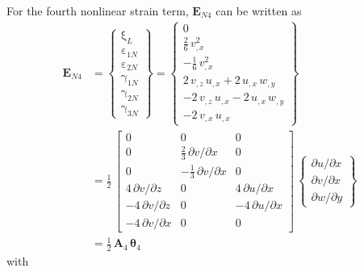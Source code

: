 For the fourth nonlinear strain term, $\mathbf{E}_{N4}$ can be written as
\begin{equation}
	\begin{aligned}
		\mathbf{E}_{N4} & =  \begin{Bmatrix}
			\mathrm \xi_{L} \\
			\mathrm \varepsilon_{1N} \\                    
			\mathrm \varepsilon_{2N} \\           
			\mathrm \gamma_{1N} \\                
			\mathrm \gamma_{2N} \\                
			\mathrm \gamma_{3N} \end{Bmatrix} =   
		\begin{Bmatrix}                       
			0\\
			\tfrac{2}{6} \, v_{,x}^2   \\
			- \tfrac{1}{6} \, v_{,x}^2  \\
			2 \, v_{,z} \, u_{,x} + 2 \, u_{,x} \, w_{,y}   \\
			- 2 \, v_{,z} \, u_{,x} - 2 \, u_{,x} \, w_{,y} \\ 
			- 2 \, v_{,x} \, u_{,x}  \end{Bmatrix} \\
		& = \frac{1}{2} \, \begin{bmatrix}
			0 & 0 &  0   \\
			0 &  \tfrac{2}{3} \, \partial v / \partial x & 0  \\
			0 &  - \tfrac{1}{3} \, \partial v / \partial x & 0 \\
			4 \, \partial v / \partial z &  0 & 4 \, \partial u / \partial x  \\
			-4 \,\partial v / \partial z &  0 & -4 \,\partial u / \partial x  \\
			-4 \,\partial v / \partial x &  0 & 0  \end{bmatrix} \, \begin{Bmatrix}
			\partial u / \partial x\\
			\partial v / \partial x \\
			\partial w / \partial y
		\end{Bmatrix} \\
	    &	= \tfrac{1}{2} \, \mathbf{A}_4 \, \boldsymbol{\theta}_4
	\end{aligned}
\end{equation}
with  
